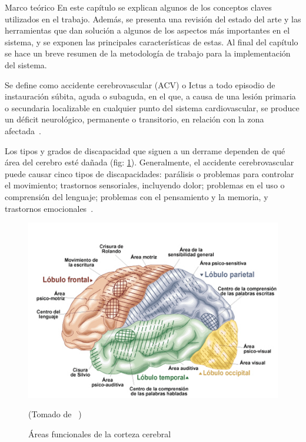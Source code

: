 \begin{thesischapter}{1} {Marco teórico}
    En este capítulo se explican algunos de los conceptos claves utilizados en el trabajo. Además, se presenta una revisión del estado del arte y las herramientas que dan solución a algunos de los aspectos más importantes en el sistema, y se exponen
    las principales características de estas. Al final del capítulo se hace un breve resumen de la metodología de trabajo para la implementación del sistema.

    
    \vspace{10pt}
    Se define como accidente cerebrovascular (ACV) o Ictus a todo episodio de instauración súbita, aguda o subaguda, en el que, a causa de una lesión primaria o secundaria localizable en cualquier punto del sistema cardiovascular, se produce un déficit neurológico, permanente o transitorio, en relación con la zona afectada~\cite{ictus}.

    \vspace{10pt}
    Los tipos y grados de discapacidad que siguen a un derrame dependen de qué área del cerebro esté dañada (fig: \ref{fig: cerebralcortex}). Generalmente, el accidente cerebrovascular puede
    causar cinco tipos de discapacidades: parálisis o problemas para controlar el movimiento; trastornos sensoriales, incluyendo dolor; problemas en el uso o comprensión del lenguaje; problemas con el pensamiento y la memoria, y trastornos emocionales~\cite{post-strok}. 
    \begin{figure}[ht]
        \centering
        \includegraphics[scale=0.5]{images/brain.jpg}
        \caption{Áreas funcionales de la corteza cerebral}
        (Tomado de ~\cite{areacereabral})
        \label{fig: cerebralcortex}
    \end{figure}


\end{thesischapter}
